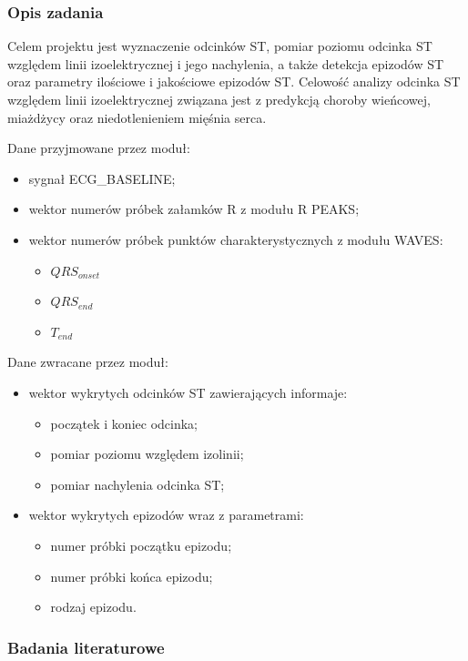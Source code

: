 \documentclass[a4paper, 11pt]{article}
\begin{document}
\subsubsection{Opis zadania}
\label{sec:st_interval:desc}
Celem projektu jest wyznaczenie odcinków ST, pomiar poziomu odcinka ST względem linii izoelektrycznej i jego nachylenia, a także detekcja epizodów ST oraz parametry ilościowe i jakościowe epizodów ST. Celowość analizy odcinka ST względem linii izoelektrycznej związana jest z predykcją choroby wieńcowej, miażdżycy oraz niedotlenieniem mięśnia serca.

Dane przyjmowane przez moduł:
\begin{itemize}
  \item sygnał ECG\_BASELINE;
  \item wektor numerów próbek załamków R z modułu R PEAKS;
  \item wektor numerów próbek punktów charakterystycznych z modułu WAVES:
  \begin{itemize}
    \item $QRS_{onset}$
    \item $QRS_{end}$
    \item $T_{end}$
  \end{itemize}  
\end{itemize}

Dane zwracane przez moduł:
\begin{itemize}
  \item wektor wykrytych odcinków ST zawierających informaje:
  \begin{itemize}
    \item początek i koniec odcinka;
    \item pomiar poziomu względem izolinii;
    \item pomiar nachylenia odcinka ST;
  \end{itemize}
  \item wektor wykrytych epizodów wraz z parametrami:
  \begin{itemize}
    \item numer próbki początku epizodu;
    \item numer próbki końca epizodu;
    \item rodzaj epizodu.
  \end{itemize}
\end{itemize}

\subsubsection{Badania literaturowe}
\label{sec:st_interval:papers}
\end{document}
